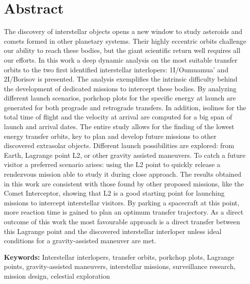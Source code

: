 \chapter*{Abstract}

The discovery of interstellar objects opens a new window to study asteroids and
comets formed in other planetary systems. Their highly eccentric orbits
challenge our ability to reach these bodies, but the giant scientific return
well requires all our efforts. In this work a deep dynamic analysis on the most
suitable transfer orbits to the two first identified interstellar interlopers: 1I/Oumuamua'
and 2I/Borisov is presented. The analysis exemplifies the intrinsic difficulty
behind the development of dedicated missions to intercept these bodies. By
analyzing different launch scenarios, porkchop plots for the specific energy at
launch are generated for both prograde and retrograde transfers. In addition,
isolines for the total time of flight and the velocity at arrival are computed
for a big span of launch and arrival dates. The entire study allows for the
finding of the lowest energy transfer orbits, key to plan and develop future
missions to other discovered extrasolar objects. Different launch possibilities
are explored: from Earth, Lagrange point L2, or other gravity assisted
maneuvers. To catch a future visitor a preferred scenario arises: using the L2
point to quickly release a rendezvous mission able to study it during close
approach. The results obtained in this work are consistent with those found by
other proposed missions, like the Comet Interceptor, showing that L2 is a good
starting point for launching missions to intercept interstellar visitors. By
parking a spacecraft at this point, more reaction time is gained to plan an
optimum transfer trajectory. As a direct outcome of this work the most
favourable approach is a direct transfer between this Lagrange point and the
discovered interstellar interloper unless ideal conditions for a
gravity-assisted maneuver are met.

\vspace{4cm}
\textbf{Keywords:} Interstellar interlopers, transfer orbits, porkchop plots, Lagrange points,
gravity-assisted maneuvers, interstellar missions, surveillance research,
mission design, celestial exploration
